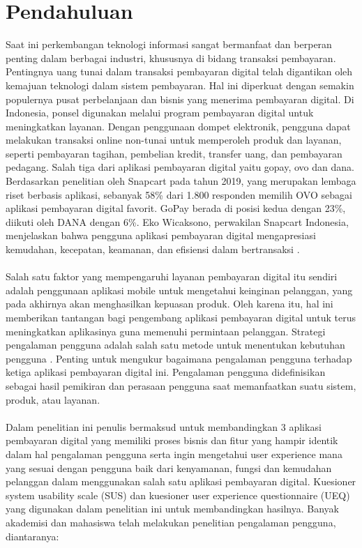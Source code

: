 \documentclass[
 manuscript=article,  %
  layout=publish, 
  year=2024, 
  month= Februari, %
  volume=8,
  number=1 
]{JIKO}
\begin{document}
\section{Pendahuluan}
Saat ini perkembangan teknologi informasi sangat bermanfaat dan berperan penting dalam berbagai industri, khususnya di bidang transaksi pembayaran. Pentingnya uang tunai dalam transaksi pembayaran digital telah digantikan oleh kemajuan teknologi dalam sistem pembayaran. Hal ini diperkuat dengan semakin populernya pusat perbelanjaan dan bisnis yang menerima pembayaran digital. Di Indonesia, ponsel digunakan melalui program pembayaran digital untuk meningkatkan layanan. Dengan penggunaan dompet elektronik, pengguna dapat melakukan transaksi online non-tunai untuk memperoleh produk dan layanan, seperti pembayaran tagihan, pembelian kredit, transfer uang, dan pembayaran pedagang. Salah tiga dari aplikasi pembayaran digital yaitu gopay, ovo dan dana. Berdasarkan penelitian oleh Snapcart pada tahun 2019, yang merupakan lembaga riset berbasis aplikasi, sebanyak 58\% dari 1.800 responden memilih OVO sebagai aplikasi pembayaran digital favorit. GoPay berada di posisi kedua dengan 23\%, diikuti oleh DANA dengan 6\%. Eko Wicaksono, perwakilan Snapcart Indonesia, menjelaskan bahwa pengguna aplikasi pembayaran digital mengapresiasi kemudahan, kecepatan, keamanan, dan efisiensi dalam bertransaksi \cite{1}.
\\ \\ 
Salah satu faktor yang mempengaruhi layanan pembayaran digital itu sendiri adalah penggunaan aplikasi mobile untuk mengetahui keinginan pelanggan, yang pada akhirnya akan menghasilkan kepuasan produk. Oleh karena itu, hal ini memberikan tantangan bagi pengembang aplikasi pembayaran digital untuk terus meningkatkan aplikasinya guna memenuhi permintaan pelanggan. Strategi pengalaman pengguna adalah salah satu metode untuk menentukan kebutuhan pengguna \cite{2}. Penting untuk mengukur bagaimana pengalaman pengguna terhadap ketiga aplikasi pembayaran digital ini. Pengalaman pengguna didefinisikan sebagai hasil pemikiran dan perasaan pengguna saat memanfaatkan suatu sistem, produk, atau layanan. 
\\ \\
Dalam penelitian ini penulis bermaksud untuk membandingkan 3 aplikasi pembayaran digital yang memiliki proses bisnis dan fitur yang hampir identik dalam hal pengalaman pengguna serta ingin mengetahui user experience mana yang sesuai dengan pengguna baik dari kenyamanan, fungsi dan kemudahan pelanggan dalam menggunakan salah satu aplikasi pembayaran digital. Kuesioner system usability scale (SUS) dan kuesioner user experience questionnaire (UEQ) yang digunakan dalam penelitian ini untuk membandingkan hasilnya. Banyak akademisi dan mahasiswa telah melakukan penelitian pengalaman pengguna, diantaranya:
\end{document}

